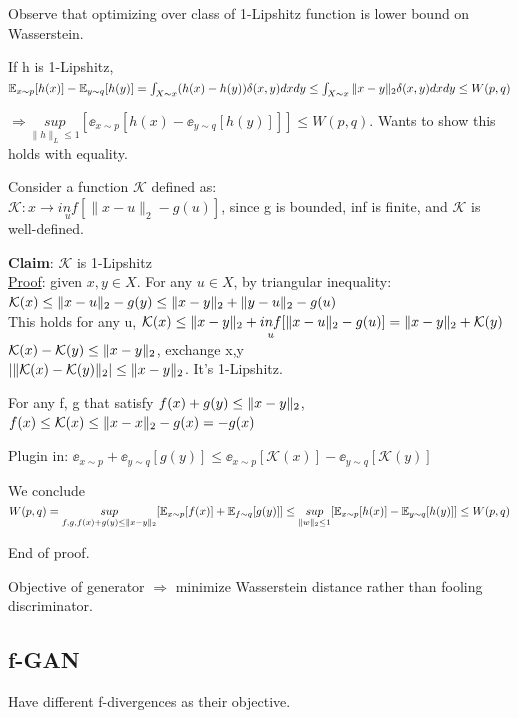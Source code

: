 \documentclass[12pt,a4paper]{article}
\begin{document}
Observe that optimizing over class of 1-Lipshitz function is lower bound on Wasserstein. 

If h is 1-Lipshitz,\\
$\mathbb{E}_{x\sim p}[h(x)]-\mathbb{E}_{y\sim q}[h(y)]=\int_{X\sim x}(h(x)-h(y))\delta(x,y)dxdy\\
\le \int_{X\sim x}\|x-y\|_2\delta(x,y)dxdy\\
\le W(p,q)$

$\Rightarrow \underset{\|h\|_L\le 1}{sup}[\ee_{x\sim p}[h(x)-\ee_{y\sim q}[h(y)]]]\le W(p, q)$. 
Wants to show this holds with equality. 

Consider a function $\mathcal{K}$ defined as:\\
$\mathcal{K}: x\rightarrow \underset{u}{inf}[\|x-u\|_2-g(u)]$, since g is bounded, inf is finite, and $\mathcal{K}$ is well-defined.

\textbf{Claim}: $\mathcal{K}$ is 1-Lipshitz\\
\underline{Proof}: given $x,y\in X$. For any $u\in X$, by triangular inequality:\\
$\mathcal{K}(x)\le \|x-u\|_2-g(y)\le \|x-y\|_2+\|y-u\|_2-g(u)$\\
This holds for any u, $\mathcal{K}(x)\le \|x-y\|_2+\underset{u}{inf} [\|x-u\|_2-g(u)]=\|x-y\|_2+\mathcal{K}(y)$\\
$\mathcal{K}(x)-\mathcal{K}(y)\le \|x-y\|_2$, exchange x,y\\
$|\|\mathcal{K}(x)-\mathcal{K}(y)\|_2|\le \|x-y\|_2$. It's 1-Lipshitz. 

For any f, g that satisfy $f(x)+g(y)\le\|x-y\|_2$,\\ 
$f(x)\le \mathcal{K}(x)\le \|x-x\|_2-g(x)=-g(x)$

Plugin in: $\ee_{x\sim p} +\ee_{y\sim q}[g(y)] \le \ee_{x\sim p}[\mathcal{K}(x)]-\ee_{y\sim q}[\mathcal{K}(y)]$

We conclude\\
$W(p,q)=\underset{f,g,f(x)+g(y)\le \|x-y\|_2}{sup}[\mathbb{E}_{x\sim p}[f(x)]+\mathbb{E}_{f\sim q}[g(y)]]
\le \underset{\|w\|_2\le 1}{sup}[\mathbb{E}_{x\sim p}[h(x)]-\mathbb{E}_{y\sim q}[h(y)]]\le W(p,q)$

End of proof. 

\vspace{0.5cm}
Objective of generator $\Rightarrow$ minimize Wasserstein distance rather than fooling discriminator. 

\subsection{f-GAN}
Have different f-divergences as their objective. 
\end{document}
